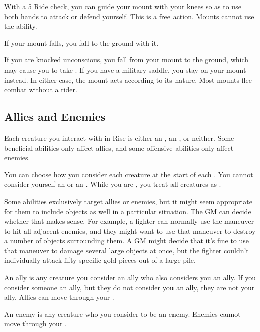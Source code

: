      With a  5 Ride check, you can guide your mount with your knees so as to use both hands to attack or defend yourself.
    This is a free action.
    Mounts cannot use the  ability.

     If your mount falls, you fall to the ground with it.

     If you are knocked unconscious, you fall from your mount to the ground, which may cause you to take .
    If you have a military saddle, you stay on your mount instead.
    In either case, the mount acts according to its nature.
    Most mounts flee combat without a rider.

  \subsection{Allies and Enemies}\label{Allies and Enemies}
    Each creature you interact with in Rise is either an , an , or neither.
    Some beneficial abilities only affect allies, and some offensive abilities only affect enemies.

    You can choose how you consider each creature at the start of each .
    You cannot consider yourself an  or an .
    While you are \unconscious, you treat all creatures as .

    Some abilities exclusively target allies or enemies, but it might seem appropriate for them to include objects as well in a particular situation.
    The GM can decide whether that makes sense.
    For example, a fighter can normally use the  maneuver to hit all adjacent enemies, and they might want to use that maneuver to destroy a number of objects surrounding them.
    A GM might decide that it's fine to use that maneuver to damage several large objects at once, but the fighter couldn't individually attack fifty specific gold pieces out of a large pile.

     An ally is any creature you consider an ally who also considers you an ally.
    If you consider someone an ally, but they do not consider you an ally, they are not your ally.
    Allies can move through your .

     An enemy is any creature who you consider to be an enemy.
    Enemies cannot move through your .

